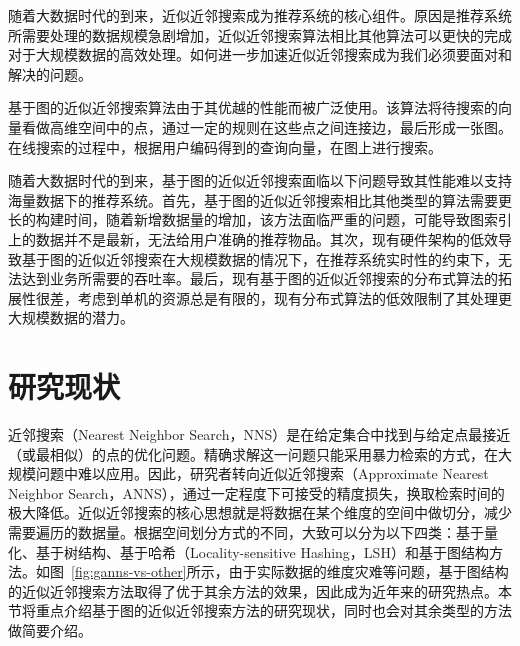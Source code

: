 随着大数据时代的到来，近似近邻搜索成为推荐系统的核心组件\cite{chen2022approximate}。原因是推荐系统所需要处理的数据规模急剧增加，近似近邻搜索算法相比其他算法可以更快的完成对于大规模数据的高效处理\cite{wang2021comprehensive, jiang2020clustering, xu2022proximity}。如何进一步加速近似近邻搜索成为我们必须要面对和解决的问题。

基于图的近似近邻搜索算法由于其优越的性能而被广泛使用\cite{chen2022finger, yu2022gpu, groh2022ggnn}。该算法将待搜索的向量看做高维空间中的点，通过一定的规则在这些点之间连接边，最后形成一张图。在线搜索的过程中，根据用户编码得到的查询向量，在图上进行搜索。

随着大数据时代的到来，基于图的近似近邻搜索面临以下问题导致其性能难以支持海量数据下的推荐系统。首先，基于图的近似近邻搜索相比其他类型的算法需要更长的构建时间，随着新增数据量的增加，该方法面临严重的问题，可能导致图索引上的数据并不是最新，无法给用户准确的推荐物品。其次，现有硬件架构的低效导致基于图的近似近邻搜索在大规模数据的情况下，在推荐系统实时性的约束下，无法达到业务所需要的吞吐率。最后，现有基于图的近似近邻搜索的分布式算法的拓展性很差，考虑到单机的资源总是有限的，现有分布式算法的低效限制了其处理更大规模数据的潜力。

\section{研究现状}

近邻搜索（Nearest Neighbor Search，NNS）是在给定集合中找到与给定点最接近（或最相似）的点的优化问题\cite{nns-wiki}。精确求解这一问题只能采用暴力检索的方式，在大规模问题中难以应用。因此，研究者转向近似近邻搜索（Approximate Nearest Neighbor Search，ANNS），通过一定程度下可接受的精度损失，换取检索时间的极大降低。近似近邻搜索的核心思想就是将数据在某个维度的空间中做切分，减少需要遍历的数据量。根据空间划分方式的不同，大致可以分为以下四类：基于量化\cite{pq-2010, opq-2013, douze2016polysemous, zhang2019grip, kalantidis2014locally, abdelhadi2019accelerated}、基于树结构\cite{kdtree-2008, Annoy, houle2014rank,arora2018hd, muja2014scalable, wang2013trinary}、基于哈希（Locality-sensitive Hashing，LSH）\cite{lsh-1999, lsh-2004, sh-2008, sun2014srs, terasawa2007spherical, liu2014sk}和基于图结构\cite{kgraph-2011, nsw-2014, hnsw-2018, nsg-2019, dpg-2019}方法。如图~\ref{fig:ganns-vs-other}所示，由于实际数据的维度灾难等问题，基于图结构的近似近邻搜索方法取得了优于其余方法的效果，因此成为近年来的研究热点。本节将重点介绍基于图的近似近邻搜索方法的研究现状，同时也会对其余类型的方法做简要介绍。

